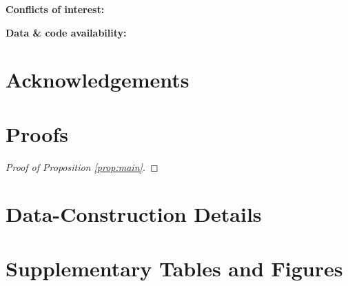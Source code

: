\documentclass[11pt,a4paper]{article}
\begin{document}
\noindent\textbf{Conflicts of interest:} %

\noindent\textbf{Data \& code availability:} %

\section*{Acknowledgements}



\appendix

\section{Proofs}
\label{app:proofs}

\begin{proof}[Proof of Proposition \ref{prop:main}]
\end{proof}

\section{Data-Construction Details}
\label{app:data}

\section{Supplementary Tables and Figures}
\label{app:supp}
\end{document}
